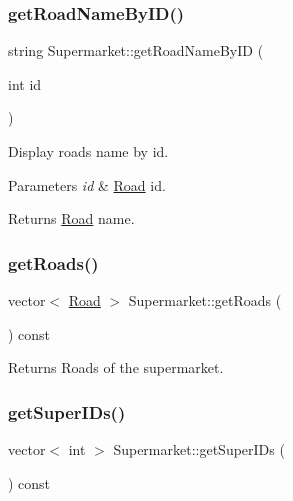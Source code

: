 \subsubsection{\texorpdfstring{get\+Road\+Name\+By\+I\+D()}{getRoadNameByID()}}
{\footnotesize\ttfamily string Supermarket\+::get\+Road\+Name\+By\+ID (\begin{DoxyParamCaption}\item[{int}]{id }\end{DoxyParamCaption})}



Display roads name by id. 


\begin{DoxyParams}{Parameters}
{\em id} & \hyperlink{class_road}{Road} id.\\
\hline
\end{DoxyParams}
\begin{DoxyReturn}{Returns}
\hyperlink{class_road}{Road} name. 
\end{DoxyReturn}
\mbox{\label{class_supermarket_a3fdea775417ae5f96cd99eff5759c46e}} 
\subsubsection{\texorpdfstring{get\+Roads()}{getRoads()}}
{\footnotesize\ttfamily vector$<$ \hyperlink{class_road}{Road} $>$ Supermarket\+::get\+Roads (\begin{DoxyParamCaption}{ }\end{DoxyParamCaption}) const}

\begin{DoxyReturn}{Returns}
Roads of the supermarket. 
\end{DoxyReturn}
\mbox{\label{class_supermarket_a0fdfd6a3d01f655a16a5297697852be6}} 
\subsubsection{\texorpdfstring{get\+Super\+I\+Ds()}{getSuperIDs()}}
{\footnotesize\ttfamily vector$<$ int $>$ Supermarket\+::get\+Super\+I\+Ds (\begin{DoxyParamCaption}{ }\end{DoxyParamCaption}) const}

